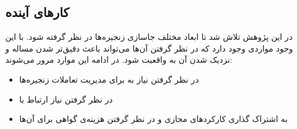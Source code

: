 \subsection{کارهای آینده}

در این پژوهش تلاش شد تا ابعاد مختلف جاسازی زنجیره‌ها در نظر گرفته شود.
با این وجود مواردی وجود دارد که در نظر گرفتن آن‌ها می‌تواند باعث دقیق‌تر شدن مساله
و نزدیک شدن آن به واقعیت شود.
در ادامه این موارد مرور می‌شوند:

\begin{itemize}
    \item در نظر گرفتن نیاز به  برای مدیریت تعاملات زنجیره‌ها
    \item در نظر گرفتن نیاز ارتباط  با 
    \item به اشتراک گذاری کارکردهای مجازی و در نظر گرفتن هزینه‌ی گواهی برای آن‌ها
\end{itemize}